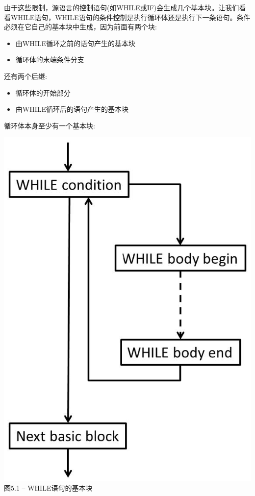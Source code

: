 由于这些限制，源语言的控制语句(如WHILE或IF)会生成几个基本块。让我们看看WHILE语句，WHILE语句的条件控制是执行循环体还是执行下一条语句。条件必须在它自己的基本块中生成，因为前面有两个块:\par

\begin{itemize}
\item 由WHILE循环之前的语句产生的基本块
\item 循环体的末端条件分支
\end{itemize}

还有两个后继:\par

\begin{itemize}
\item 循环体的开始部分
\item 由WHILE循环后的语句产生的基本块
\end{itemize}

循环体本身至少有一个基本块:\par

\hspace*{\fill} \par %
\begin{center}
\includegraphics{content/2/chapter5/images/1.jpg}\\
图5.1 – WHILE语句的基本块
\end{center}

